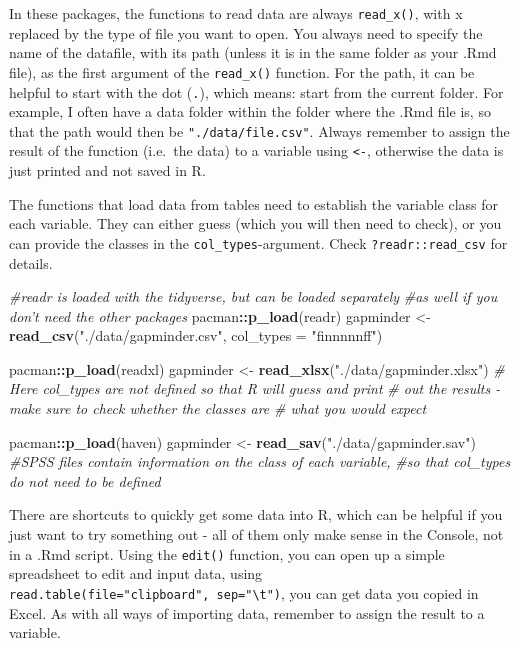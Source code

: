 \documentclass[
]{book}
\newenvironment{Shaded}{\begin{snugshade}}{\end{snugshade}}
\newcommand{\CommentTok}[1]{\textcolor[rgb]{0.56,0.35,0.01}{\textit{#1}}}
\newcommand{\DataTypeTok}[1]{\textcolor[rgb]{0.13,0.29,0.53}{#1}}
\newcommand{\KeywordTok}[1]{\textcolor[rgb]{0.13,0.29,0.53}{\textbf{#1}}}
\newcommand{\NormalTok}[1]{#1}
\newcommand{\OperatorTok}[1]{\textcolor[rgb]{0.81,0.36,0.00}{\textbf{#1}}}
\newcommand{\StringTok}[1]{\textcolor[rgb]{0.31,0.60,0.02}{#1}}
\begin{document}
In these packages, the functions to read data are always \texttt{read\_x()}, with x replaced by the type of file you want to open. You always need to specify the name of the datafile, with its path (unless it is in the same folder as your .Rmd file), as the first argument of the \texttt{read\_x()} function. For the path, it can be helpful to start with the dot (\texttt{.}), which means: start from the current folder. For example, I often have a data folder within the folder where the .Rmd file is, so that the path would then be \texttt{"./data/file.csv"}. Always remember to assign the result of the function (i.e.~the data) to a variable using \texttt{\textless{}-}, otherwise the data is just printed and not saved in R.

The functions that load data from tables need to establish the variable class for each variable. They can either guess (which you will then need to check), or you can provide the classes in the \texttt{col\_types}-argument. Check \texttt{?readr::read\_csv} for details.

\begin{Shaded}
\begin{Highlighting}[]
\CommentTok{#readr is loaded with the tidyverse, but can be loaded separately }
\CommentTok{#as well if you don't need the other packages}
\NormalTok{pacman}\OperatorTok{::}\KeywordTok{p_load}\NormalTok{(readr)}
\NormalTok{gapminder <-}\StringTok{ }\KeywordTok{read_csv}\NormalTok{(}\StringTok{"./data/gapminder.csv"}\NormalTok{, }\DataTypeTok{col_types =} \StringTok{"finnnnnff"}\NormalTok{)}

\NormalTok{pacman}\OperatorTok{::}\KeywordTok{p_load}\NormalTok{(readxl)}
\NormalTok{gapminder <-}\StringTok{ }\KeywordTok{read_xlsx}\NormalTok{(}\StringTok{"./data/gapminder.xlsx"}\NormalTok{) }
\CommentTok{# Here col_types are not defined so that R will guess and print }
\CommentTok{# out the results - make sure to check whether the classes are }
\CommentTok{# what you would expect}

\NormalTok{pacman}\OperatorTok{::}\KeywordTok{p_load}\NormalTok{(haven)}
\NormalTok{gapminder <-}\StringTok{ }\KeywordTok{read_sav}\NormalTok{(}\StringTok{"./data/gapminder.sav"}\NormalTok{) }
\CommentTok{#SPSS files contain information on the class of each variable, }
\CommentTok{#so that col_types do not need to be defined}
\end{Highlighting}
\end{Shaded}

There are shortcuts to quickly get some data into R, which can be helpful if you just want to try something out - all of them only make sense in the Console, not in a .Rmd script. Using the \texttt{edit()} function, you can open up a simple spreadsheet to edit and input data, using \texttt{read.table(file="clipboard",\ sep="\textbackslash{}t")}, you can get data you copied in Excel. As with all ways of importing data, remember to assign the result to a variable.
\end{document}
